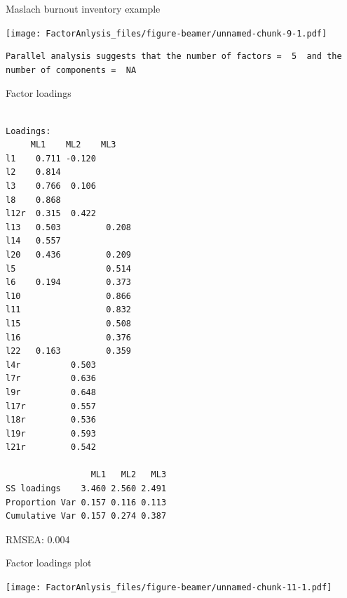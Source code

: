 \documentclass[10pt,ignorenonframetext,]{beamer}
\begin{document}
\begin{frame}[fragile]{Maslach burnout inventory example}

\texttt{[image: FactorAnlysis\_files/figure-beamer/unnamed-chunk-9-1.pdf]}

\begin{verbatim}
Parallel analysis suggests that the number of factors =  5  and the number of components =  NA 
\end{verbatim}

\end{frame}

\begin{frame}[fragile]{Factor loadings}

\tiny

\begin{verbatim}

Loadings:
     ML1    ML2    ML3   
l1    0.711 -0.120       
l2    0.814              
l3    0.766  0.106       
l8    0.868              
l12r  0.315  0.422       
l13   0.503         0.208
l14   0.557              
l20   0.436         0.209
l5                  0.514
l6    0.194         0.373
l10                 0.866
l11                 0.832
l15                 0.508
l16                 0.376
l22   0.163         0.359
l4r          0.503       
l7r          0.636       
l9r          0.648       
l17r         0.557       
l18r         0.536       
l19r         0.593       
l21r         0.542       

                 ML1   ML2   ML3
SS loadings    3.460 2.560 2.491
Proportion Var 0.157 0.116 0.113
Cumulative Var 0.157 0.274 0.387
\end{verbatim}

RMSEA: 0.004

\end{frame}

\begin{frame}{Factor loadings plot}

\texttt{[image: FactorAnlysis\_files/figure-beamer/unnamed-chunk-11-1.pdf]}

\end{frame}
\end{document}
